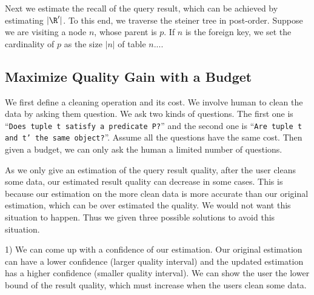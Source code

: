 
Next we estimate the recall of the query result, which can be achieved by estimating $|\R'|$. To this end, we traverse the steiner tree in post-order. Suppose we are visiting a node $n$, whose parent is $p$. If $n$ is the foreign key, we set the cardinality of $p$ as the size $|n|$ of table $n$.... 








\subsection{Maximize Quality Gain with a Budget}\label{subsec:gain}

We first define a cleaning operation and its cost. We involve human to clean the data by asking them question. We ask two kinds of questions. The first one is ``\texttt{Does tuple t satisfy a predicate P?}'' and the second one is ``\texttt{Are tuple t and t' the same object?}''. Assume all the questions have the same cost. Then given a budget, we can only ask the human a limited number of questions.



As we only give an estimation of the query result quality, after the user cleans some data, our estimated result quality can decrease in some cases. This is because our estimation on the more clean data is more accurate than our original estimation, which can be over estimated the quality. We would not want this situation to happen. Thus we given three possible solutions to avoid this situation. 


1) We can come up with a confidence of our estimation. Our original estimation can have a lower confidence (larger quality interval) and the updated estimation has a higher confidence (smaller quality interval). We can show the user the lower bound of the result quality, which must increase when the users clean some data.

